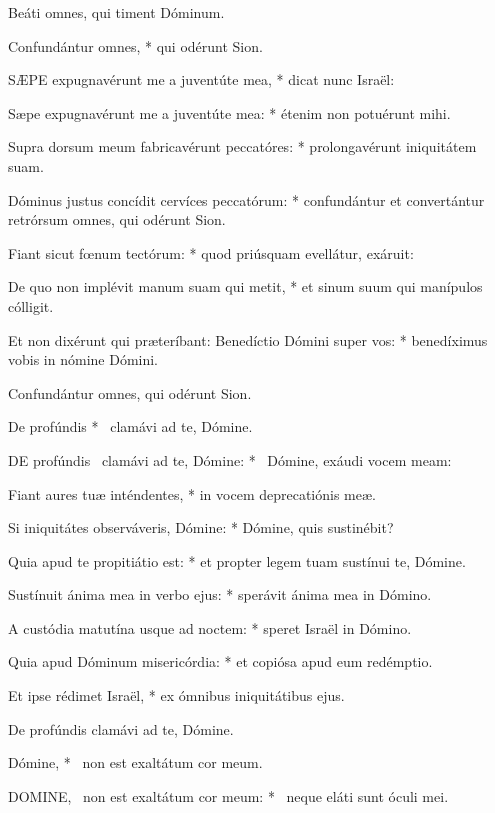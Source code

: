  Beáti omnes, qui timent Dóminum.

 Confundántur omnes, * qui odérunt Sion.


\lettrine[lines=2]{S}{ÆPE} expugnavérunt me a juventúte mea, * dicat nunc Israël:

Sæpe expugnavérunt me a juventúte mea: * étenim non potuérunt mihi.

Supra dorsum meum fabricavérunt peccatóres: * prolongavérunt iniquitátem suam.

Dóminus justus concídit cervíces peccatórum: * confundántur et convertántur retrórsum omnes, qui odérunt Sion.

Fiant sicut fœnum tectórum: * quod priúsquam evellátur, exáruit:

De quo non implévit manum suam qui metit, * et sinum suum qui manípulos cólligit.

Et non dixérunt qui præteríbant: Benedíctio Dómini super vos: * benedíximus vobis in nómine Dómini.

 Confundántur omnes, qui odérunt Sion.

 De profúndis * \textdagger\ clamávi ad te, Dómine. \textdaggerdbl


\lettrine[lines=2]{D}{E} profúndis \textdagger\ clamávi ad te, Dómine: * \textdaggerdbl\ Dómine, exáudi vocem meam:

Fiant aures tuæ inténdentes, * in vocem deprecatiónis meæ.

Si iniquitátes observáveris, Dómine: * Dómine, quis sustinébit?

Quia apud te propitiátio est: * et propter legem tuam sustínui te, Dómine.

Sustínuit ánima mea in verbo ejus: * sperávit ánima mea in Dómino.

A custódia matutína usque ad noctem: * speret Israël in Dómino.

Quia apud Dóminum misericórdia: * et copiósa apud eum redémptio.

Et ipse rédimet Israël, * ex ómnibus iniquitátibus ejus.

 De profúndis clamávi ad te, Dómine.

 Dómine, * \textdagger\ non est exaltátum cor meum. \textdaggerdbl


\lettrine[lines=2]{D}{OMINE}, \textdagger\ non est exaltátum cor meum: * \textdaggerdbl\ neque eláti sunt óculi mei.

